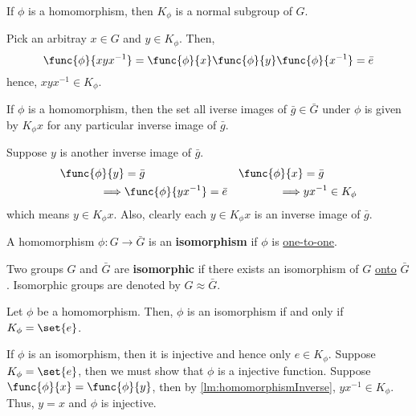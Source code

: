 \begin{lemma}
    If \(\phi\) is a homomorphism, then \(K_{\phi}\) is a normal subgroup of \(G\).
\end{lemma}

\begin{prooflemma}
    Pick an arbitray \(x \in G\) and \(y \in K_{\phi}\). Then, 
    \begin{equation*}
        \func{\phi}{x y x^{-1}} = \func{\phi}{x} \func{\phi}{y} \func{\phi}{x^{-1}} = \bar{e}
    \end{equation*}
    hence, \(xyx^{-1} \in K_{\phi}\).
\end{prooflemma}

\begin{lemma}\label{lm:homomorphismInverse}
    If \(\phi\) is a homomorphism, then the set all iverse images of \(\bar{g} \in \bar{G}\) under \(\phi\) is given by \(K_{\phi} x\) for any particular inverse image of \(\bar{g}\).
\end{lemma}

\begin{prooflemma}
    Suppose \(y\) is another inverse image of \(\bar{g}\). 
    \begin{align*}
        \func{\phi}{y} &= \bar{g} & \func{\phi}{x} &=\bar{g}\\
        \implies & \func{\phi}{yx^{-1}} = \bar{e} &\implies& yx^{-1} \in K_{\phi}
    \end{align*}
    which means \(y \in K_{\phi}{x}\). Also, clearly each \(y \in K_{\phi}{x}\) is an inverse image of \(\bar{g}\).
\end{prooflemma}

\begin{definition}
    A homomorphism \(\phi: G \to \bar{G}\) is an \textbf{isomorphism} if \(\phi\) is \underline{one-to-one}.
\end{definition}

\begin{definition}
    Two groups \(G\) and \(\bar{G}\) are \textbf{isomorphic} if there exists an isomorphism of \(G\) \underline{onto} \(\bar{G}\). Isomorphic groups are denoted by \(G \approx \bar{G}\).
\end{definition}

\begin{corollary}
    Let \(\phi\) be a homomorphism. Then, \(\phi\) is an isomorphism if and only if \(K_{\phi} = \set{e}\).
\end{corollary}

\begin{prooflemma}
    If \(\phi\) is an isomorphism, then it is injective and hence only \(e \in K_{\phi}\). Suppose \(K_{\phi} = \set{e}\), then we must show that \(\phi\) is a injective function. Suppose \(\func{\phi}{x} = \func{\phi}{y}\), then by \ref{lm:homomorphismInverse}, \(y x^{-1} \in K_{\phi}\). Thus, \(y = x\) and \(\phi\) is injective.
\end{prooflemma}

